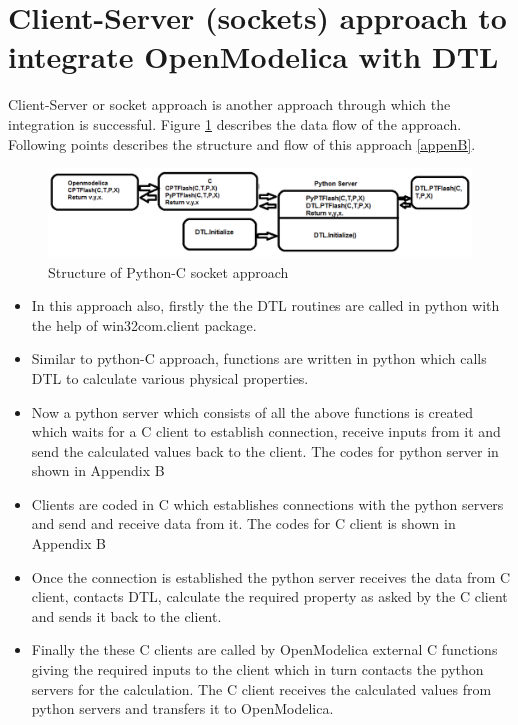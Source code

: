 \documentclass[12pt]{report}
\begin{document}
\section{Client-Server (sockets) approach to integrate OpenModelica with DTL} \cite{socket}
Client-Server or socket approach is another approach through which the integration is successful. Figure \ref{fig:PyC2} describes the data flow of the approach. Following points describes the structure and flow of this approach \ref{appenB}.

\begin{figure}
\centering
\includegraphics[width=1\linewidth]{PytC2}
\caption{Structure of Python-C socket approach}
\label{fig:PyC2}
\end{figure}

\begin{itemize}
\item{In this approach also, firstly the the DTL routines are called in python with the help of win32com.client package.}
\item{Similar to python-C approach, functions are written in python which calls DTL to calculate various physical properties.}
\item{Now a python server which consists of all the above functions is created which waits for a C client to establish connection, receive inputs from it and send the calculated values back to the client. The codes for python server in shown in Appendix B}
\item{Clients are coded in C which establishes connections with the python servers and send and receive data from it. The codes for C client is shown in Appendix B}
\item{Once the connection is established the python server receives the data from C client, contacts DTL, calculate the required property as asked by the C client and sends it back to the client.}
\item{Finally the these C clients are called by OpenModelica external C functions giving the required inputs to the client which in turn contacts the python servers for the calculation. The C client receives the calculated values from python servers and transfers it to OpenModelica.}
\end{itemize}
\end{document}
